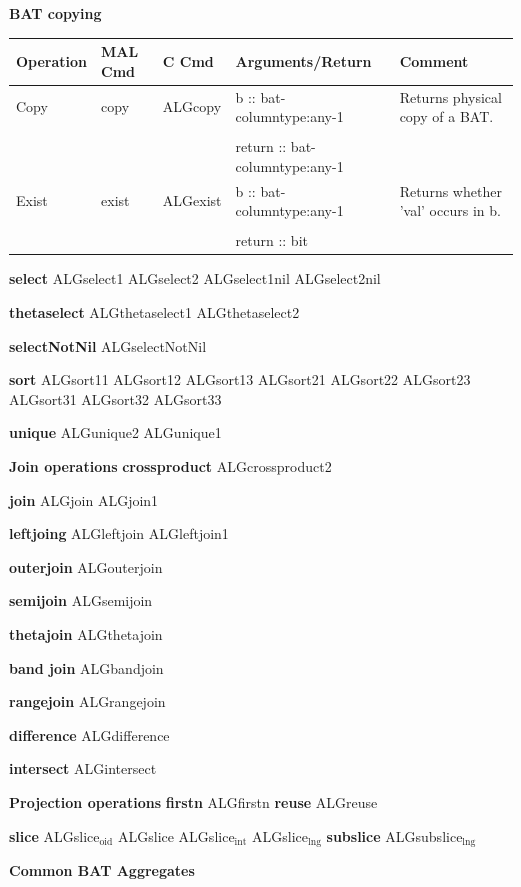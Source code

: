 \documentclass[11pt]{article}
\begin{document}
\textbf{BAT copying}

\begin{center}
\begin{tabular}{lllll}
\hline
Operation & MAL Cmd & C Cmd & Arguments/Return & Comment\\
\hline
Copy & copy & ALGcopy & b :: bat-columntype:any-1 & Returns physical copy of a BAT.\\
 &  &  &  & \\
 &  &  & return :: bat-columntype:any-1 & \\
\hline
Exist & exist & ALGexist & b :: bat-columntype:any-1 & Returns whether 'val' occurs in b.\\
 &  &  &  & \\
 &  &  & return :: bit & \\
\hline
\end{tabular}
\end{center}

\textbf{select}
ALGselect1
ALGselect2
ALGselect1nil
ALGselect2nil

\textbf{thetaselect}
ALGthetaselect1
ALGthetaselect2

\textbf{selectNotNil}
ALGselectNotNil

\textbf{sort}
ALGsort11
ALGsort12
ALGsort13
ALGsort21
ALGsort22
ALGsort23
ALGsort31
ALGsort32
ALGsort33

\textbf{unique}
ALGunique2
ALGunique1

\textbf{\textbf{Join operations}}
\textbf{crossproduct}
ALGcrossproduct2

\textbf{join}
ALGjoin
ALGjoin1

\textbf{leftjoing}
ALGleftjoin
ALGleftjoin1

\textbf{outerjoin}
ALGouterjoin

\textbf{semijoin}
ALGsemijoin

\textbf{thetajoin}
ALGthetajoin

\textbf{band join}
ALGbandjoin

\textbf{rangejoin}
ALGrangejoin

\textbf{difference}
ALGdifference

\textbf{intersect}
ALGintersect

\textbf{\textbf{Projection operations}}
\textbf{firstn}
ALGfirstn
\textbf{reuse}
ALGreuse

\textbf{slice}
ALGslice\(_{\text{oid}}\)
ALGslice
ALGslice\(_{\text{int}}\)
ALGslice\(_{\text{lng}}\)
\textbf{subslice}
ALGsubslice\(_{\text{lng}}\)

\textbf{\textbf{Common BAT Aggregates}}
\end{document}
